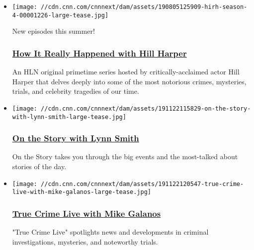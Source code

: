 \begin{itemize}
\item
  \href{/shows/how-it-really-happened}{}

  \texttt{[image: //cdn.cnn.com/cnnnext/dam/assets/190805125909-hirh-season-4-00001226-large-tease.jpg]}

  New episodes this summer!

  \hypertarget{how-it-really-happened-with-hill-harper}{%
  \subsubsection{\texorpdfstring{\href{/shows/how-it-really-happened}{How
  It Really Happened with Hill
  Harper}}{How It Really Happened with Hill Harper}}\label{how-it-really-happened-with-hill-harper}}

  An HLN original primetime series hosted by critically-acclaimed actor
  Hill Harper that delves deeply into some of the most notorious crimes,
  mysteries, trials, and celebrity tragedies of our time.
\end{itemize}

\begin{itemize}
\item
  \href{/shows/on-the-story}{}

  \texttt{[image: //cdn.cnn.com/cnnnext/dam/assets/191122115829-on-the-story-with-lynn-smith-large-tease.jpg]}

  \hypertarget{on-the-story-with-lynn-smith}{%
  \subsubsection{\texorpdfstring{\href{/shows/on-the-story}{On the Story
  with Lynn
  Smith}}{On the Story with Lynn Smith}}\label{on-the-story-with-lynn-smith}}

  On the Story takes you through the big events and the most-talked
  about stories of the day.
\end{itemize}

\begin{itemize}
\item
  \href{/shows/true-crime}{}

  \texttt{[image: //cdn.cnn.com/cnnnext/dam/assets/191122120547-true-crime-live-with-mike-galanos-large-tease.jpg]}

  \hypertarget{true-crime-live-with-mike-galanos}{%
  \subsubsection{\texorpdfstring{\href{/shows/true-crime}{True Crime
  Live with Mike
  Galanos}}{True Crime Live with Mike Galanos}}\label{true-crime-live-with-mike-galanos}}

  "True Crime Live" spotlights news and developments in criminal
  investigations, mysteries, and noteworthy trials.
\end{itemize}

